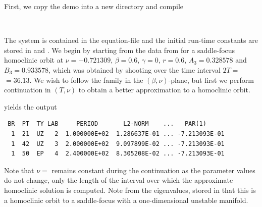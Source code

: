 \documentclass[12pt]{report}
\begin{document}
First, we copy the demo into a new directory and compile
\begin{center}
 \\
\end{center}
The system is contained in 
the equation-file  and the initial run-time constants
are stored in  and . We begin by starting from
the data from  for a saddle-focus homoclinic orbit 
at 
$\nu=-0.721309$, $\beta=0.6$, $\gamma=0$, $r=0.6$, $A_3=0.328578$ 
and $B_3=0.933578$, which was obtained by shooting over 
the time interval $2T=$$=36.13$.
We wish to follow the family in the $(\beta,\nu)$-plane, but 
first we perform continuation in $(T,\nu)$ to obtain a better 
approximation to a homoclinic orbit.
\begin{center}
\end{center} 
yields the output
\begin{verbatim}
 BR  PT  TY LAB     PERIOD       L2-NORM    ...   PAR(1)     
  1  21  UZ   2  1.000000E+02  1.286637E-01 ... -7.213093E-01
  1  42  UZ   3  2.000000E+02  9.097899E-02 ... -7.213093E-01
  1  50  EP   4  2.400000E+02  8.305208E-02 ... -7.213093E-01
\end{verbatim}
Note that $\nu=$ remains constant during the continuation
as the parameter values do not change, only the length of
the interval over which the approximate homoclinic solution is computed.
Note from the eigenvalues, stored in  that this is a homoclinic
orbit to a saddle-focus with a one-dimensional unstable manifold.
\end{document}
